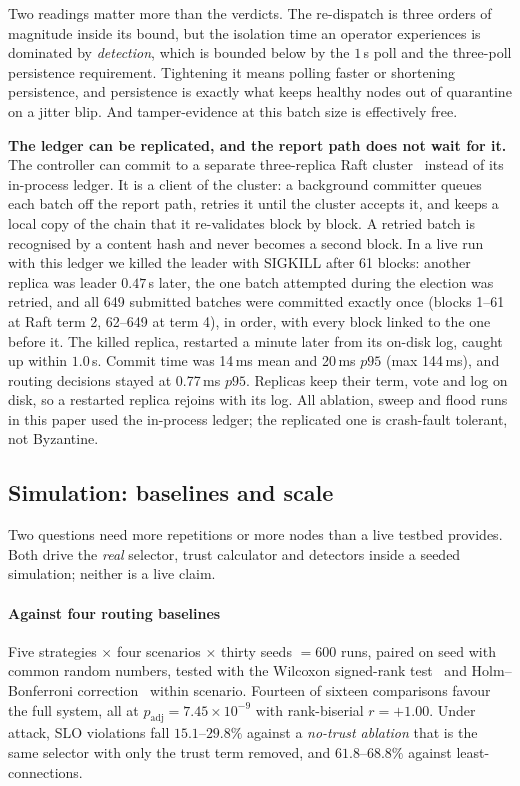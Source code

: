\documentclass[10pt,twocolumn,letterpaper]{article}
\begin{document}
Two readings matter more than the verdicts. The re-dispatch is three orders of
magnitude inside its bound, but the isolation time an operator experiences is
dominated by \emph{detection}, which is bounded below by the $1$\,s poll and
the three-poll persistence requirement. Tightening it means polling faster or
shortening persistence, and persistence is exactly what keeps healthy nodes out
of quarantine on a jitter blip. And tamper-evidence at this batch size is
effectively free.

\textbf{The ledger can be replicated, and the report path does not wait for it.}
The controller can commit to a separate three-replica Raft
cluster~\cite{ongaro2014raft} instead of its in-process ledger. It is a client of
the cluster: a background committer queues each batch off the report path,
retries it until the cluster accepts it, and keeps a local copy of the chain that
it re-validates block by block. A retried batch is recognised by a content hash
and never becomes a second block. In a live run with this ledger we killed the
leader with SIGKILL after 61 blocks: another replica was leader $0.47$\,s
later, the one batch attempted during the election was retried, and all 649
submitted batches were committed exactly once (blocks 1--61 at Raft term 2,
62--649 at term 4), in order, with every block linked to the one before it. The
killed replica, restarted a minute later from its on-disk log, caught up within
$1.0$\,s. Commit time was 14\,ms mean and 20\,ms $p95$ (max 144\,ms), and
routing decisions stayed at 0.77\,ms $p95$.
Replicas keep their term, vote and
log on disk, so a restarted replica rejoins with its log. All ablation, sweep and
flood runs in this paper used the in-process ledger; the replicated one is
crash-fault tolerant, not Byzantine.

\subsection{Simulation: baselines and scale}
\label{sec:res:sim}
Two questions need more repetitions or more nodes than a live testbed provides.
Both drive the \emph{real} selector, trust calculator and detectors inside a
seeded simulation; neither is a live claim.

\paragraph*{Against four routing baselines}
Five strategies $\times$ four scenarios $\times$ thirty seeds $= 600$ runs,
paired on seed with common random numbers, tested with the Wilcoxon
signed-rank test~\cite{wilcoxon1945} and Holm--Bonferroni
correction~\cite{holm1979} within scenario. Fourteen of sixteen comparisons
favour the full system, all at $p_{\mathrm{adj}} = 7.45\times10^{-9}$ with
rank-biserial $r = +1.00$. Under attack, SLO violations fall $15.1$--$29.8\%$
against a \emph{no-trust ablation} that is the same selector with only the
trust term removed, and $61.8$--$68.8\%$ against least-connections.
\end{document}

